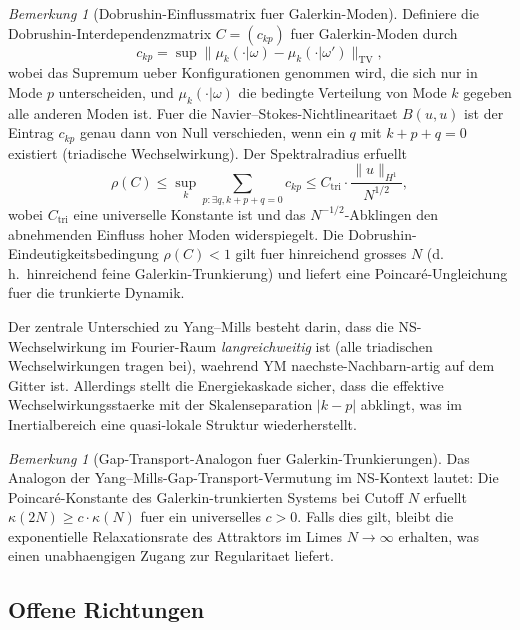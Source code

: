 \documentclass[12pt,a4paper]{article}
\theoremstyle{definition}
\theoremstyle{plain}
\theoremstyle{remark}
\newtheorem{remark}[definition]{Bemerkung}
\begin{document}
\begin{remark}[Dobrushin-Einflussmatrix fuer Galerkin-Moden]
\label{rem:dobrushin-galerkin}
Definiere die Dobrushin-Interdependenzmatrix $C = (c_{kp})$ fuer Galerkin-Moden durch
\[
c_{kp} = \sup \| \mu_k(\cdot | \omega) - \mu_k(\cdot | \omega') \|_{\mathrm{TV}},
\]
wobei das Supremum ueber Konfigurationen genommen wird, die sich nur in Mode $p$ unterscheiden, und $\mu_k(\cdot | \omega)$ die bedingte Verteilung von Mode $k$ gegeben alle anderen Moden ist. Fuer die Navier--Stokes-Nichtlinearitaet $B(u, u)$ ist der Eintrag $c_{kp}$ genau dann von Null verschieden, wenn ein $q$ mit $k + p + q = 0$ existiert (triadische Wechselwirkung). Der Spektralradius erfuellt
\[
\rho(C) \leq \sup_k \sum_{p: \exists q, k+p+q=0} c_{kp} \leq C_{\mathrm{tri}} \cdot \frac{\|u\|_{H^1}}{N^{1/2}},
\]
wobei $C_{\mathrm{tri}}$ eine universelle Konstante ist und das $N^{-1/2}$-Abklingen den abnehmenden Einfluss hoher Moden widerspiegelt. Die Dobrushin-Eindeutigkeitsbedingung $\rho(C) < 1$ gilt fuer hinreichend grosses $N$ (d.\,h.\ hinreichend feine Galerkin-Trunkierung) und liefert eine Poincar\'e-Ungleichung fuer die trunkierte Dynamik.

Der zentrale Unterschied zu Yang--Mills besteht darin, dass die NS-Wechselwirkung im Fourier-Raum \emph{langreichweitig} ist (alle triadischen Wechselwirkungen tragen bei), waehrend YM naechste-Nachbarn-artig auf dem Gitter ist. Allerdings stellt die Energiekaskade sicher, dass die effektive Wechselwirkungsstaerke mit der Skalenseparation $|k - p|$ abklingt, was im Inertialbereich eine quasi-lokale Struktur wiederherstellt.
\end{remark}

\begin{remark}[Gap-Transport-Analogon fuer Galerkin-Trunkierungen]
\label{rem:gap-transport-galerkin}
Das Analogon der Yang--Mills-Gap-Transport-Vermutung im NS-Kontext lautet: Die Poincar\'e-Konstante des Galerkin-trunkierten Systems bei Cutoff $N$ erfuellt $\kappa(2N) \geq c \cdot \kappa(N)$ fuer ein universelles $c > 0$. Falls dies gilt, bleibt die exponentielle Relaxationsrate des Attraktors im Limes $N \to \infty$ erhalten, was einen unabhaengigen Zugang zur Regularitaet liefert.
\end{remark}

\subsection{Offene Richtungen}
\end{document}
